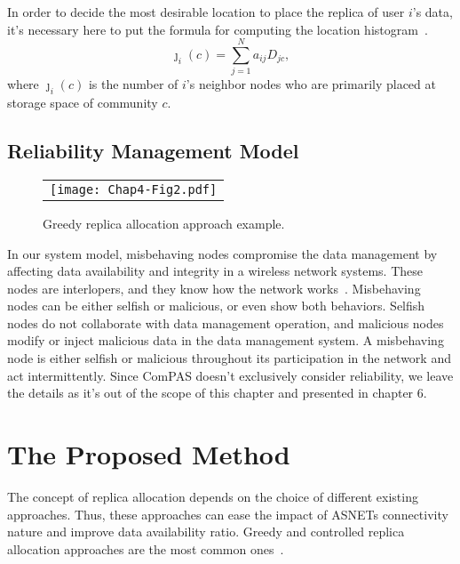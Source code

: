 In order to decide the most desirable location to place the replica of user $i$'s data, it's necessary here to put the formula for computing the location histogram~\cite{DTran2012}.
\begin{equation}
\jmath_i(c)=\sum_{j=1}^N a_{ij}D_{jc},
\end{equation}
where $\jmath_i(c)$ is the number of $i$'s neighbor nodes who are primarily placed at storage space of community $c$.

\subsection{Reliability Management Model}\label{Chap4_03_04}
\begin{figure}[h]
\begin{center}
  \begin{tabular}{c}
  \texttt{[image: Chap4-Fig2.pdf]}
  \end{tabular}
  \caption{Greedy replica allocation approach example.}
  \label{fig:Chap4-Fig2}
\end{center}
\end{figure}

In our system model, misbehaving nodes compromise the data management by affecting data availability and integrity in a wireless network systems. These nodes are interlopers, and they know how the network works~\cite{YLi2011}. Misbehaving nodes can be either selfish or malicious, or even show both behaviors. Selfish nodes do not collaborate with data management operation, and malicious nodes modify or inject malicious data in the data management system. A misbehaving node is either selfish or malicious throughout its participation in the network and act intermittently. Since ComPAS doesn't exclusively consider reliability, we leave the details as it's out of the scope of this chapter and presented in chapter 6.


\section{The Proposed Method}\label{Chap4_04}
The concept of replica allocation depends on the choice of different existing approaches. Thus, these approaches can ease the impact of ASNETs connectivity nature and improve data availability ratio. Greedy and controlled replica allocation approaches are the most common ones~\cite{KWei2013}.


